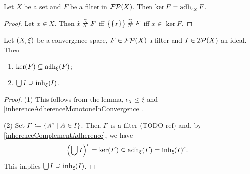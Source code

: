 \begin{lemma}
Let $X$ be a set and $F$ be a filter in $\operatorname{\mathcal{FP}}(X)$. Then $\ker F = \operatorname{adh}_{\iota_X} F$.
\end{lemma}
\begin{proof}
Let $x\in X$. Then $\dot{x} \mathrel{\widehat{\#}} F$ iff $\big\{\{x\}\big\} \mathrel{\widehat{\#}} F$ iff $x\in \ker F$.
\end{proof}
\begin{corollary} \label{kernelAdherence}
Let $\left( X,\xi \right)$ be a convergence space, $F\in \operatorname{\mathcal{FP}}(X)$ a filter and $I\in\operatorname{\mathcal{IP}}(X)$ an ideal. Then
\begin{enumerate}
\item $\ker(F) \subseteq \operatorname{adh}_\xi(F)$;
\item $\bigcup I \supseteq \operatorname{inh}_\xi(I)$.
\end{enumerate}
\end{corollary}
\begin{proof}
(1) This follows from the lemma, $\iota_X \leq \xi$ and \ref{inherenceAdherenceMonotoneInConvergence}.

(2) Set $I' \coloneqq \left\{ A^c \;\middle|\; A\in I \right\}$. Then $I'$ is a filter (TODO ref) and, by \ref{inherenceComplementAdherence}, we have
\[ \left(\bigcup I\right)^c = \ker(I') \subseteq  \operatorname{adh}_\xi(I') = \operatorname{inh}_\xi(I)^c. \]
This implies $\bigcup I \supseteq \operatorname{inh}_\xi(I)$.
\end{proof}

